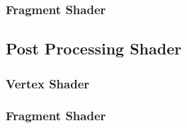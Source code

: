 \begin{appendices}
\subsubsection{Fragment Shader}

\subsection{Post Processing Shader}

\subsubsection{Vertex Shader}

\subsubsection{Fragment Shader}

\end{appendices}
